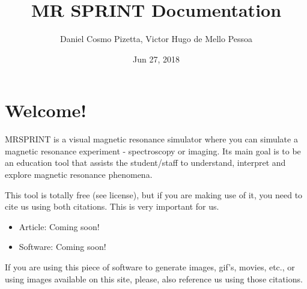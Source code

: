 \documentclass[a4paper,10pt,english]{sphinxmanual}
\title{MR SPRINT Documentation}
\date{Jun 27, 2018}
\author{Daniel Cosmo Pizetta, Victor Hugo de Mello Pessoa}
\begin{document}
\maketitle
\sphinxtableofcontents
{}\label{\detokenize{index::doc}}



 


\chapter{Welcome!}
\label{\detokenize{readme:welcome}}\label{\detokenize{readme::doc}}

MRSPRINT is a visual magnetic resonance simulator where you can simulate
a magnetic resonance experiment - spectroscopy or imaging. Its main goal is
to be an education tool that assists the student/staff to understand,
interpret and explore magnetic resonance phenomena.

This tool is totally free (see license), but if you are making use of it,
you need to cite us using both citations. This is very important for us.
\begin{itemize}
\item {} 
Article: Coming soon!

\item {} 
Software: Coming soon!

\end{itemize}

If you are using this piece of software to generate images, gif’s, movies,
etc., or using images available on this site, please, also reference us
using those citations.
\end{document}
